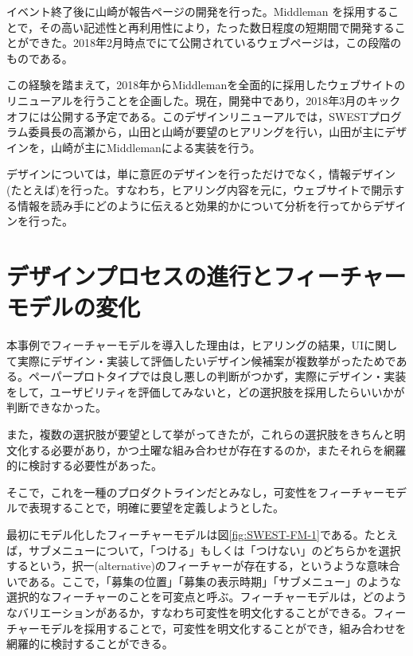 \documentclass[submit,techrep]{ipsj}
\begin{document}
イベント終了後に山崎が報告ページの開発を行った。Middleman\cite{Middleman} を採用することで，その高い記述性と再利用性により，たった数日程度の短期間で開発することができた。2018年2月時点で\cite{SWEST}にて公開されているウェブページは，この段階のものである。

この経験を踏まえて，2018年からMiddlemanを全面的に採用したウェブサイトのリニューアルを行うことを企画した。現在，開発中であり，2018年3月のキックオフには公開する予定である。このデザインリニューアルでは，SWESTプログラム委員長の高瀬から，山田と山崎が要望のヒアリングを行い，山田が主にデザインを，山崎が主にMiddlemanによる実装を行う。

デザインについては，単に意匠のデザインを行っただけでなく，情報デザイン(たとえば\cite{InfoDesign}\cite{InfoDesignWorkshop})を行った。すなわち，ヒアリング内容を元に，ウェブサイトで開示する情報を読み手にどのように伝えると効果的かについて分析を行ってからデザインを行った。



\section{デザインプロセスの進行とフィーチャーモデルの変化}

本事例でフィーチャーモデルを導入した理由は，ヒアリングの結果，UIに関して実際にデザイン・実装して評価したいデザイン候補案が複数挙がったためである。ペーパープロトタイプでは良し悪しの判断がつかず，実際にデザイン・実装をして，ユーザビリティを評価してみないと，どの選択肢を採用したらいいかが判断できなかった。

また，複数の選択肢が要望として挙がってきたが，これらの選択肢をきちんと明文化する必要があり，かつ土曜な組み合わせが存在するのか，またそれらを網羅的に検討する必要性があった。

そこで，これを一種のプロダクトライン\cite{SPLE}\cite{FORM}だとみなし，可変性をフィーチャーモデル\cite{FORM}で表現することで，明確に要望を定義しようとした。

最初にモデル化したフィーチャーモデルは図\ref{fig:SWEST-FM-1}である。たとえば，サブメニューについて，「つける」もしくは「つけない」のどちらかを選択するという，択一(alternative)のフィーチャーが存在する，というような意味合いである。ここで，「募集の位置」「募集の表示時期」「サブメニュー」のような選択的なフィーチャーのことを可変点と呼ぶ。フィーチャーモデルは，どのようなバリエーションがあるか，すなわち可変性を明文化することができる。フィーチャーモデルを採用することで，可変性を明文化することができ，組み合わせを網羅的に検討することができる。
\end{document}
